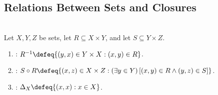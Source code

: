 \subsection{Relations Between Sets and Closures}

\begin{definition} \label{def:inverse-and-composition-of-relations} \\
Let $X,Y,Z$ be sets, let $R\subseteq X\times Y$, and let $S\subseteq Y\times Z$.
\begin{enumerate}[label=(\roman*)]
\setlength{\itemsep}{0pt}
\item {}: $R^{-1}\defeq\{(y,x)\in Y\times X:(x,y)\in R\}$.
\item {}: $S\circ R\defeq\{(x,z)\in X\times Z:(\exists y\in Y)\,[(x,y)\in R\land(y,z)\in S]\}$.
\item {}: $\Delta_X\defeq\{(x,x):x\in X\}$.
\end{enumerate}
\end{definition}

